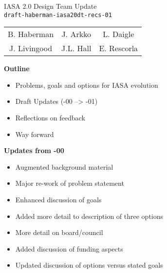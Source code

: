 \documentclass[helvetica,a4paper,landscape]{seminar}
\newcommand{\heading}[1]{%
  \begin{center} 
    \large\bf 
    #1 
  \end{center} 
  \vspace{.4 in}}
\begin{document}
\begin{slide}
\begin{center}
\vspace{.5 in}
\LARGE{{\bf}IASA 2.0 Design Team Update\\{\small \verb^draft-haberman-iasa20dt-recs-01^}}\\
\vspace{.2in}
\large{
\begin{tabular}{ c c c }
B. Haberman & J. Arkko & L. Daigle \\
J. Livingood & J.L. Hall & E. Rescorla 
\end{tabular}
}
\end{center}
\end{slide}

\centerslidesfalse 

\begin{slide}
\heading{Outline}

\begin{itemize}
\item Problems, goals and options for IASA evolution
\item Draft Updates (-00 --> -01)
\item Reflections on feedback
\item Way forward
\end{itemize}

\end{slide}

\begin{slide}

\heading{Updates from -00}

{\footnotesize
\begin{itemize}
\item Augmented background material
\item Major re-work of problem statement
\item Enhanced discussion of goals
\item Added more detail to description of three options
\item More detail on board/council
\item Added discussion of funding aspects
\item Updated discussion of options versus stated goals
\end{itemize}
}

\end{slide}
\end{document}
